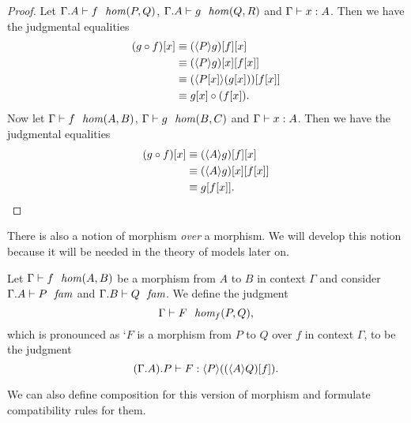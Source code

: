 \begin{proof}
Let $\jhom{{\Gamma}{A}}{P}{Q}{f}$, $\jhom{{\Gamma}{A}}{Q}{R}{g}$ and $\jterm{\Gamma}{A}{x}$.
Then we have the judgmental equalities
\begin{align*}
\subst{x}{\jcomp{A}{f}{g}}
& \jdeq \subst{x}{{f}{\ctxwk{P}{g}}}\\
& \jdeq \subst{{x}{f}}{{x}{\ctxwk{P}{g}}}\\
& \jdeq \subst{{x}{f}}{\ctxwk{\subst{x}{P}}{\subst{x}{g}}}\\
& \jdeq \jcomp{\subst{x}{P}}{\subst{x}{f}}{\subst{x}{g}}.
\end{align*}
Now let $\jhom{\Gamma}{A}{B}{f}$, $\jhom{\Gamma}{B}{C}{g}$ and $\jterm{\Gamma}{A}{x}$.
Then we have the judgmental equalities
\begin{align*}
\subst{x}{\jcomp{A}{f}{g}}
& \jdeq \subst{x}{{f}{\ctxwk{A}{g}}}\\
& \jdeq \subst{{x}{f}}{{x}{\ctxwk{A}{g}}}\\
& \jdeq \subst{{x}{f}}{g}.
\end{align*}
\end{proof}

There is also a notion of morphism \emph{over} a morphism. We will develop this
notion because it will be needed in the theory of models later on.

\begin{defn}
Let $\jhom{\Gamma}{A}{B}{f}$ be a morphism from $A$ to $B$ in context $\Gamma$
and consider $\jfam{{\Gamma}{A}}{P}$ and $\jfam{{\Gamma}{B}}{Q}$. We define the
judgment
\begin{equation*}
\jfhom{\Gamma}{A}{B}{f}{P}{Q}{F},
\end{equation*}
which is pronounced as `$F$ is a morphism from $P$ to $Q$ over $f$ in context
$\Gamma$, to be the judgment
\begin{equation*}
\unfold{\jfhom{\Gamma}{A}{B}{f}{P}{Q}{F}}.
\end{equation*}
\end{defn}

We can also define composition for this version of morphism and formulate
compatibility rules for them. 

